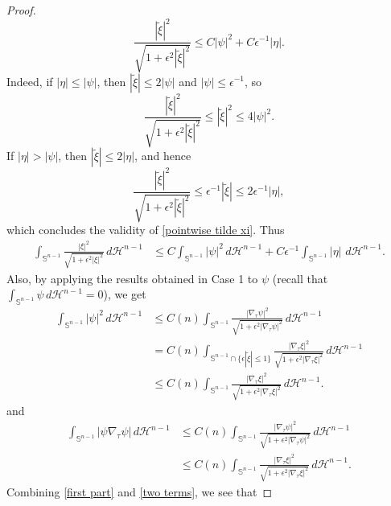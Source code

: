 \documentclass[10pt,a4paper]{amsart}
\def\ez{\epsilon}
\begin{document}
\begin{proof}
\begin{equation}
\frac{|\tilde\xi|^2}{\sqrt{1+\epsilon^2|\tilde\xi|^2}}
\le
C |\psi|^2 + C\epsilon^{-1}|\eta|.
\end{equation}
Indeed, if $|\eta|\le |\psi|$, then $|\tilde\xi|\le 2|\psi|$ and $|\psi|\le \epsilon^{-1}$, so
$$
\frac{|\tilde\xi|^2}{\sqrt{1+\epsilon^2|\tilde\xi|^2}}
\le |\tilde\xi|^2 \le 4|\psi|^2.
$$
If $|\eta|>|\psi|$, then $|\tilde\xi|\le 2|\eta|$, and hence
$$
\frac{|\tilde\xi|^2}{\sqrt{1+\epsilon^2|\tilde\xi|^2}}
\le \epsilon^{-1}|\tilde\xi|\le 2\epsilon^{-1}|\eta|,
$$
which concludes the validity of \eqref{pointwise tilde xi}. 
Thus
\begin{equation}\label{two terms}
    \begin{split}
     \int_{\mathbb S^{n-1}} \frac{|\xi|^2}{\sqrt{1+\ez^2|\xi|^2}} \,d\mathscr H^{n-1}
 & \leq  C \int_{\mathbb S^{n-1}}  {|\psi|^2}  \,d\mathscr H^{n-1}+ C \ez^{-1}\int_{\mathbb S^{n-1}} |\eta|  \, \,d\mathscr H^{n-1}.
    \end{split}
\end{equation}
Also, by applying the results obtained in Case 1 to $\psi$ (recall that $\int_{\mathbb S^{n-1}}\psi\,d\mathscr H^{n-1}=0$), we get
\begin{equation}
    \begin{split}
   \int_{\mathbb S^{n-1}} |\psi|^2 \,d\mathscr H^{n-1}
  &\le  C(n)  \int_{\mathbb S^{n-1}} \frac{|\nabla_\tau  \psi|^2}{\sqrt{1+\ez^2|\nabla_\tau \psi|^2}} \,d\mathscr H^{n-1}\\
 &=  C(n)  \int_{\mathbb S^{n-1}\cap \{\ez|\tilde\xi|\le 1\}} \frac{|\nabla_\tau  \xi|^2}{\sqrt{1+\ez^2|\nabla_\tau \xi|^2}} \,d\mathscr H^{n-1}\\
  &\le  C(n)  \int_{\mathbb S^{n-1} } \frac{|\nabla_\tau  \xi|^2}{\sqrt{1+\ez^2|\nabla_\tau \xi|^2}} \,d\mathscr H^{n-1}.  \label{first part}
    \end{split}
\end{equation}
and
\begin{equation}
    \begin{split}
\int_{\mathbb S^{n-1}} |\psi \nabla_\tau \psi| \,d\mathscr H^{n-1}& \le  C(n)  \int_{\mathbb S^{n-1}} \frac{|\nabla_\tau  \psi|^2}{\sqrt{1+\ez^2|\nabla_\tau \psi|^2}} \,d\mathscr H^{n-1}  \\
& \le  C(n)  \int_{\mathbb S^{n-1} } \frac{|\nabla_\tau  \xi|^2}{\sqrt{1+\ez^2|\nabla_\tau \xi|^2}} \,d\mathscr H^{n-1}. \label{psi W11}
    \end{split}
\end{equation}
Combining \eqref{first part} and \eqref{two terms}, we see that

\end{proof}
\end{document}
